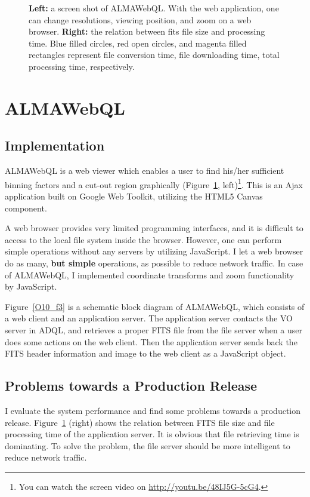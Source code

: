 \documentclass[11pt,twoside]{article}
\begin{document}
\begin{figure}
	\caption{{\bf Left:} a screen shot of ALMAWebQL. With the web application, one can change resolutions,
	viewing position, and zoom on a web browser.
	{\bf Right:} the relation between fits file size and processing time. Blue filled circles, red
	open circles, and magenta filled rectangles represent file conversion time, file downloading time,
	total processing time, respectively.\label{O10_f2}}
\end{figure}


\section{ALMAWebQL}


\subsection{Implementation}

ALMAWebQL is a web viewer which enables a user to find his/her sufficient binning
factors and a cut-out region graphically (Figure~\ref{O10_f2}, left)\footnote{
You can watch the screen video on \url{http://youtu.be/48IJ5G-5cG4}.}.
This is an Ajax application built on Google Web Toolkit, utilizing the HTML5 Canvas component.

A web browser provides very limited programming interfaces, and it is difficult to access to
the local file system inside the browser.
However, one can perform simple operations without any servers by utilizing  JavaScript.
I let a web browser do as many, {\bf but simple} operations, as possible to reduce network
traffic.
In case of ALMAWebQL, I implemented coordinate transforms and zoom functionality by
JavaScript.

Figure~\ref{O10_f3} is a schematic block diagram of ALMAWebQL, which consists of a web
client and an application server.
The application server contacts the VO server in ADQL, and retrieves a proper FITS file
from the file server when a user does some actions on the web client.
Then the application server sends back the FITS header information and image to the
web client as a JavaScript object.

\subsection{Problems towards a Production Release}

I evaluate the system performance and find some problems towards a production release.
Figure~\ref{O10_f2} (right) shows the relation between FITS file size and file processing time
of the application server.
It is obvious that file retrieving time is dominating.
To solve the problem, the file server should be more intelligent to reduce network
traffic.
\end{document}
